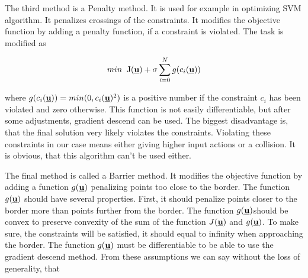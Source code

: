 \documentclass{article}
\newcommand{\uvec}{\textbf{\underline{u}}}
\begin{document}
The third method is a Penalty method. It is used for example in optimizing SVM algorithm. It penalizes crossings of the constraints. It modifies the objective function by adding a penalty function, if a constraint is violated. The task is modified as 

\begin{equation}
min\;\;\mathrm{J}(\uvec) + \sigma\sum_{i = 0}^N g(c_i(\uvec))
\end{equation}

where $g(c_i(\uvec)) = min(0, c_i(\uvec)^2)$ is a positive number if the constraint $c_i$ has been violated and zero otherwise. This function is not easily differentiable, but after some adjustments, gradient descend can be used. The biggest disadvantage is, that the final solution very likely violates the constraints. Violating these constraints in our case means either giving higher input actions or a collision. It is obvious, that this algorithm can't be used either.  

The final method is called a Barrier method. It modifies the objective function by adding a function $g(\uvec)$ penalizing points too close to the border. The function $g(\uvec)$ should have several properties. First, it should penalize points closer to the border more than points further from the border. The function $g(\uvec)$should be convex to preserve convexity of the sum of the function $J(\uvec)$ and $g(\uvec)$. To make sure, the constraints will be satisfied, it should equal to infinity when approaching the border. The function $g(\uvec)$ must be differentiable to be able to use the gradient descend method. From these assumptions we can say without the loss of generality, that 
\end{document}
